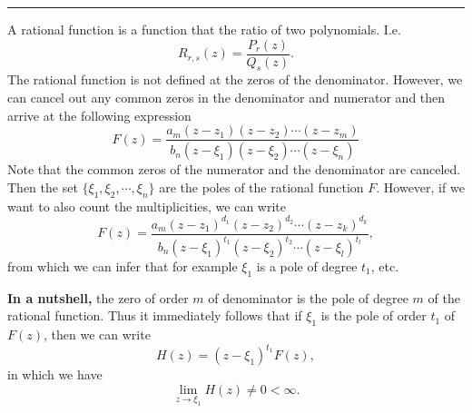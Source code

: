 \hrule

\begin{fact}
	A rational function is a function that the ratio of two polynomials. I.e.
	\[ R_{r,s}(z) = \frac{P_r(z)}{Q_s(z)}. \]
	The rational function is not defined at the zeros of the denominator. However, we can cancel out any common zeros in the denominator and numerator and then arrive at the following expression
	\[ F(z) = \frac{a_m(z-z_1)(z-z_2)\cdots(z-z_m)}{b_n(z-\xi_1)(z-\xi_2)\cdots(z-\xi_n)} \]
	Note that the common zeros of the numerator and the denominator are canceled. Then the set $\{ \xi_1, \xi_2, \cdots, \xi_n \}$ are the poles of the rational function $F$. However, if we want to also count the multiplicities, we can write
	\[ F(z) = \frac{a_m(z-z_1)^{d_1}(z-z_2)^{d_2}\cdots(z-z_k)^{d_k}}{b_n(z-\xi_1)^{t_1}(z-\xi_2)^{t_2}\cdots(z-\xi_l)^{t_l}}, \]
	from which we can infer that for example $\xi_1$ is a pole of degree $t_1$, etc.
	
	\textbf{In a nutshell,} the zero of order $m$ of denominator is the pole of degree $m$ of the rational function. Thus it immediately follows that if $\xi_1$ is the pole of order $t_1$ of  $F(z)$, then we can write
	\[ H(z) = (z-\xi_1)^{t_1} F(z), \] 
	in which we have
	\[ \lim_{z\to \xi_1} H(z) \neq 0 < \infty. \]
	
\end{fact}